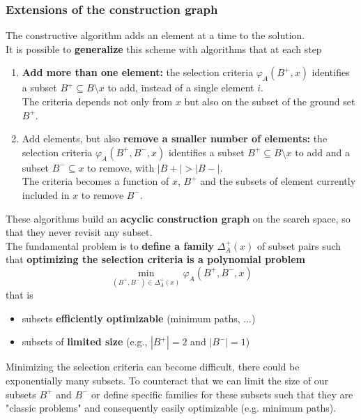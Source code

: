 \newpage

\subsubsection{Extensions of the construction graph}
The constructive algorithm adds an element at a time to the solution.\\

It is possible to \textbf{generalize} this scheme with algorithms that at each step
\begin{enumerate}
	\item \textbf{Add more than one element:} the selection criteria $\varphi_A (B^+, x)$ identifies a subset $B^+ \subseteq B \setminus x$ to add, instead of a single element $i$. \\
	The criteria depends not only from $x$ but also on the subset of the ground set $B^+$.\\
	
	\item Add elements, but also \textbf{remove a smaller number of elements:} the selection criteria $\varphi_A (B^+, B^-, x)$ identifies a subset $B^+ \subseteq B \setminus x$ to add and a subset $B^- \subseteq x$ to remove, with $|B+| > |B-|$. \\
	The criteria becomes a function of $x$, $B^+$ and the subsets of element currently included in $x$ to remove $B^-$.\\
\end{enumerate}

These algorithms build an \textbf{acyclic construction graph} on the search space, so that they never revisit any subset.\\

The fundamental problem is to \textbf{define a family} $\Delta_A^+ (x)$ of subset pairs such that \textbf{optimizing the selection criteria is a polynomial problem}
$$ \min_{(B^+, B^-) \in \Delta_A^+ (x)} \varphi_A (B^+, B^-, x) $$
that is
\begin{itemize}
	\item subsets \textbf{efficiently optimizable} (minimum paths, ...)
	\item subsets of \textbf{limited size} (e.g., $|B^+| = 2$ and $|B^-| = 1$)
\end{itemize}

Minimizing the selection criteria can become difficult, there could be exponentially many subsets. To counteract that we can limit the size of our subsets $B^+$ and $B^-$ or define specific families for these subsets such that they are "classic problems" and consequently easily optimizable (e.g. minimum paths).\\

